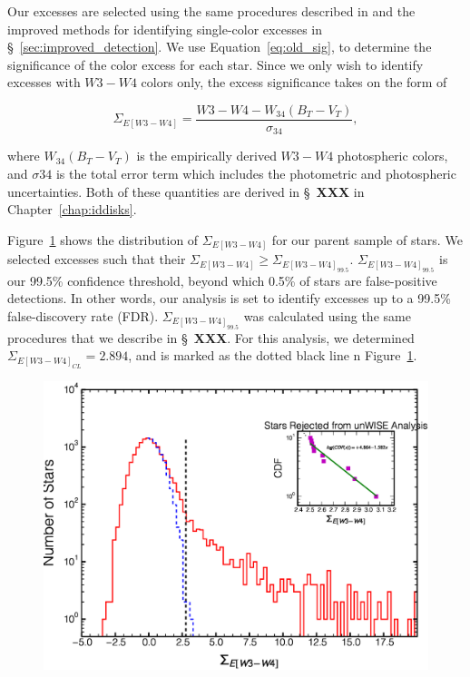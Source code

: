    Our excesses are selected using the same procedures described in \citet{Patel2014} and the improved methods for identifying single-color excesses in \S~\ref{sec:improved_detection}. We use Equation~\ref{eq:old_sig}, to determine the significance of the color excess for each star. Since we only wish to identify excesses with $W3-W4$ colors only, the excess significance takes on the form of
    
    \begin{equation}\label{eq:excess_sig_w3-w4}
    \Sigma_{E[W3-W4]} = \frac{W3-W4-W_{34}(B_T-V_T)}{\sigma_{34}},
    \end{equation}

    \noindent where $W_{34}(B_T-V_T)$ is the empirically derived $W3-W4$ photospheric colors, and $\sigma{34}$ is the total error term which includes the photometric and photospheric uncertainties. Both of these quantities are derived in \S~\textbf{XXX} in Chapter~\ref{chap:iddisks}. 
    
    Figure~\ref{fig:sige_w3-w4} shows the distribution of $\Sigma_{E[W3-W4]}$ for our parent sample of stars. We selected excesses such that their $\Sigma_{E[W3-W4]} \geq \Sigma_{E[W3-W4]_{99.5}}$. $\Sigma_{E[W3-W4]_{99.5}}$ is our 99.5\% confidence threshold, beyond which 0.5\% of stars are false-positive detections. In other words, our analysis is set to identify excesses up to a 99.5\% false-discovery rate (FDR). $\Sigma_{E[W3-W4]_{99.5}}$ was calculated using the same procedures that we describe in \S~\textbf{XXX}. For this analysis, we determined $\Sigma_{E[W3-W4]_{CL}}=2.894$, and is marked as the dotted black line n Figure~\ref{fig:sige_w3-w4}. 

    \begin{figure}
    \centering
    \includegraphics[width=\textwidth]{Ch5/W3-W4_colordist_removedunwisestars_galplane}
    \caption[Distribution of $\Sigma_{E[W3-W4]}$ in 120~pc]{}
    \label{fig:sige_w3-w4}
    \end{figure}

